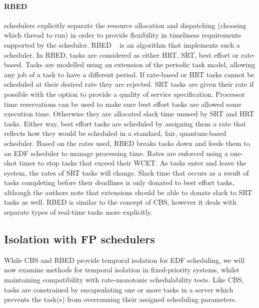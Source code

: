\paragraph{\Gls{RBED}} schedulers explicitly separate the resource allocation and dispatching
(choosing which thread to run) in order to provide flexibility in timeliness requirements supported
by the scheduler.  \Gls{RBED} ~\citep{Brandt_BLB_03} is an algorithm that implements such a
scheduler.  In \gls{RBED}, tasks are considered as either \gls{HRT}, \gls{SRT}, best effort or
rate-based.  Tasks are modelled using an extension of the periodic task model, allowing any job of a
task to have a different period.  If rate-based or \gls{HRT} tasks cannot be scheduled at their
desired rate they are rejected.  \gls{SRT} tasks are given their rate if possible with the option to
provide a quality of service specification.  Processor time reservations can be used to make sure
best effort tasks are allowed some execution time.  Otherwise they are allocated slack time unused
by SRT and HRT tasks.  Either way, best effort tasks are scheduled by assigning them a rate that
reflects how they would be scheduled in a standard, fair, quantum-based scheduler.  Based on the
rates used, \gls{RBED} breaks tasks down and feeds them to an \gls{EDF} scheduler to manage
processing time.  Rates are enforced using a one-shot timer to stop tasks that exceed their
{\gls{WCET}}.  As tasks enter and leave the system, the rates of \gls{SRT} tasks will change.  Slack
time that occurs as a result of tasks completing before their deadlines is only donated to best
effort tasks, although the authors note that extensions should be able to donate slack to \gls{SRT}
tasks as well.  \Gls{RBED} is similar to the concept of CBS, however it deals with separate types of
real-time tasks more explicitly.

\subsection{Isolation with FP schedulers}
\label{background:fp-isolation}

While \gls{CBS} and \gls{RBED} provide temporal isolation for \gls{EDF} scheduling, we will now
examine methods for temporal isolation in fixed-priority systems, whilst maintaining compatibility
with rate-monotonic schedulability tests.  Like \gls{CBS}, tasks are constrained by encapsulating
one or more tasks in a server which prevents the task(s) from overrunning their assigned scheduling
parameters.


